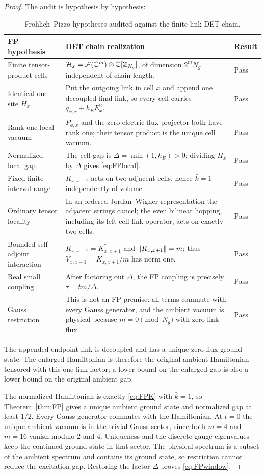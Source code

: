 \begin{proof}
The audit is hypothesis by hypothesis:
\begin{table}[htbp]
\centering
\small
\begin{tabularx}{\textwidth}{@{}p{}X p{}@{}}
\toprule
\textbf{FP hypothesis}&\textbf{DET chain realization}&\textbf{Result}\\
\midrule
Finite tensor-product cells&
$\mathcal H_x=\mathcal F(\mathbb C^m)\otimes\mathbb C[\mathbb Z_{N_g}]$, of dimension
$2^mN_g$ independent of chain length.&Pass\\
Identical one-site $H_x$&
Put the outgoing link in cell $x$ and append one decoupled final link,
so every cell carries
$q_{\phi,x}+h_EE_x^2$.&Pass\\
Rank-one local vacuum&
$P_{\phi,x}$ and the zero-electric-flux projector both have rank one;
their tensor product is the unique cell vacuum.&Pass\\
Normalized local gap&
The cell gap is $\Delta=\min(1,h_E)>0$; dividing $H_x$ by $\Delta$
gives \eqref{eq:FPlocal}.&Pass\\
Fixed finite interval range&
$K_{x,x+1}$ acts on two adjacent cells, hence $\bar k=1$ independently
of volume.&Pass\\
Ordinary tensor locality&
In an ordered Jordan--Wigner representation the adjacent strings
cancel; the even bilinear hopping, including its left-cell link
operator, acts on exactly two cells.&Pass\\
Bounded self-adjoint interaction&
$K_{x,x+1}=K_{x,x+1}^{\dagger}$ and
$\left\lVert K_{x,x+1}\right\rVert=m$; thus
$V_{x,x+1}=K_{x,x+1}/m$ has norm one.&Pass\\
Real small coupling&
After factoring out $\Delta$, the FP coupling is precisely
$\tau=tm/\Delta$.&Pass\\
Gauss restriction&
This is not an FP premise: all terms commute with every Gauss
generator, and the ambient vacuum is physical because
$m=0\pmod {N_g}$ with zero link flux.&Pass\\
\bottomrule
\end{tabularx}
\caption{Fröhlich--Pizzo hypotheses audited against the finite-link
DET chain.}
\label{tab:FPaudit}
\end{table}
The appended endpoint link is decoupled and has a unique zero-flux
ground state.  The enlarged Hamiltonian is therefore the original
ambient Hamiltonian tensored with this one-link factor; a lower bound
on the enlarged gap is also a lower bound on the original ambient gap.

The normalized Hamiltonian is exactly \eqref{eq:FPK} with
$\bar k=1$, so Theorem~\ref{thm:FP} gives a unique ambient ground state
and normalized gap at least $1/2$.  Every Gauss generator commutes with
the Hamiltonian.  At $t=0$ the unique ambient vacuum is in the trivial
Gauss sector, since both $m=4$ and $m=16$ vanish modulo $2$ and $4$.
Uniqueness and the discrete gauge eigenvalues keep the continued ground
state in that sector.  The physical spectrum is a subset of the ambient
spectrum and contains its ground state, so restriction cannot reduce
the excitation gap.  Restoring the factor $\Delta$ proves
\eqref{eq:FPwindow}.
\end{proof}

